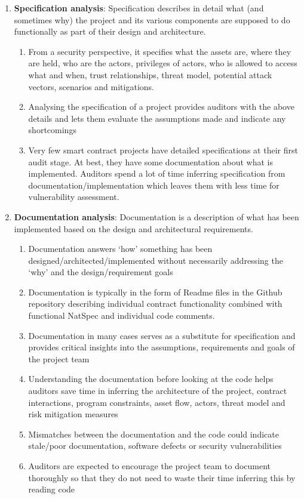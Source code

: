 \begin{enumerate}
\item\textbf{Specification analysis}: Specification describes in detail what (and sometimes why) the project and its various components are supposed to do functionally as part of their design and architecture.
	\begin{enumerate}
	\item From a security perspective, it specifies what the assets are, where they are held, who are the actors, privileges of actors, who is allowed to access what and when, trust relationships, threat model, potential attack vectors, scenarios and mitigations.
	\item Analysing the specification of a project provides auditors with the above details and lets them evaluate the assumptions made and indicate any shortcomings
	\item Very few smart contract projects have detailed specifications at their first audit stage. At best, they have some documentation about what is implemented. Auditors spend a lot of time inferring specification from documentation/implementation which leaves them with less time for vulnerability assessment.
	\end{enumerate}

\item\textbf{Documentation analysis}: Documentation is a description of what has been implemented based on the design and architectural requirements.
	\begin{enumerate}
	\item Documentation answers ‘how’ something has been designed/architected/implemented without necessarily addressing the ‘why’ and the design/requirement goals
	\item Documentation is typically in the form of Readme files in the Github repository describing individual contract functionality combined with functional NatSpec and individual code comments.
	\item Documentation in many cases serves as a substitute for specification and provides critical insights into the assumptions, requirements and goals of the project team
	\item Understanding the documentation before looking at the code helps auditors save time in inferring the architecture of the project, contract interactions, program constraints, asset flow, actors, threat model and risk mitigation measures
	\item Mismatches between the documentation and the code could indicate stale/poor documentation, software defects or security vulnerabilities
	\item Auditors are expected to encourage the project team to document thoroughly so that they do not need to waste their time inferring this by reading code
	\end{enumerate}


\end{enumerate}
